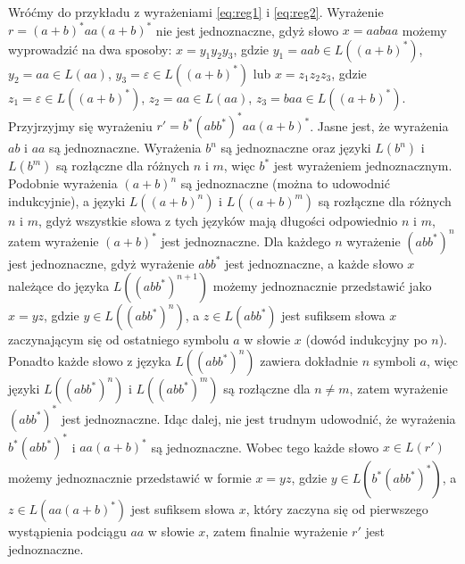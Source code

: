 Wróćmy do przykładu z wyrażeniami \ref{eq:reg1} i \ref{eq:reg2}. Wyrażenie $r=(a+b)^*aa(a+b)^*$ nie jest jednoznaczne, gdyż słowo $x=aabaa$ możemy wyprowadzić na dwa sposoby: $x=y_1 y_2 y_3$, gdzie $y_1=aab\in L((a+b)^*)$, $y_2=aa\in L(aa)$, $y_3=\varepsilon\in L((a+b)^*)$ lub $x=z_1 z_2 z_3$, gdzie $z_1=\varepsilon \in L((a+b)^*)$, $z_2=aa\in L(aa)$, $z_3=baa\in L((a+b)^*)$.\\
Przyjrzyjmy się wyrażeniu $r'=b^*(abb^*)^*aa(a+b)^*$. Jasne jest, że wyrażenia $ab$ i $aa$ są jednoznaczne. Wyrażenia $b^n$ są jednoznaczne oraz języki $L(b^n)$ i $L(b^m)$ są rozłączne dla różnych $n$ i $m$, więc $b^*$ jest wyrażeniem jednoznacznym. Podobnie wyrażenia $(a+b)^n$ są jednoznaczne (można to udowodnić indukcyjnie), a języki $L((a+b)^n)$ i $L((a+b)^m)$ są rozłączne dla różnych $n$ i $m$, gdyż wszystkie słowa z tych języków mają długości odpowiednio $n$ i $m$, zatem wyrażenie $(a+b)^*$ jest jednoznaczne. Dla każdego $n$ wyrażenie $(abb^*)^n$ jest jednoznaczne, gdyż wyrażenie $abb^*$ jest jednoznaczne, a każde słowo $x$ należące do języka $L((abb^*)^{n+1})$ możemy jednoznacznie przedstawić jako $x=yz$, gdzie $y\in L((abb^*)^n)$, a $z\in L(abb^*)$ jest sufiksem słowa $x$ zaczynającym się od ostatniego symbolu $a$ w słowie $x$ (dowód indukcyjny po $n$). Ponadto każde słowo z języka $L((abb^*)^n)$ zawiera dokładnie $n$ symboli $a$, więc języki $L((abb^*)^n)$ i $L((abb^*)^m)$ są rozłączne dla $n\neq m$, zatem wyrażenie $(abb^*)^*$ jest jednoznaczne. Idąc dalej, nie jest trudnym udowodnić, że wyrażenia $b^*(abb^*)^*$ i $aa(a+b)^*$ są jednoznaczne. Wobec tego każde słowo $x\in L(r')$ możemy jednoznacznie przedstawić w formie $x=yz$, gdzie $y\in L(b^*(abb^*)^*)$, a $z\in L(aa(a+b)^*)$ jest sufiksem słowa $x$, który zaczyna się od pierwszego wystąpienia podciągu $aa$ w słowie $x$, zatem finalnie wyrażenie $r'$ jest jednoznaczne.


